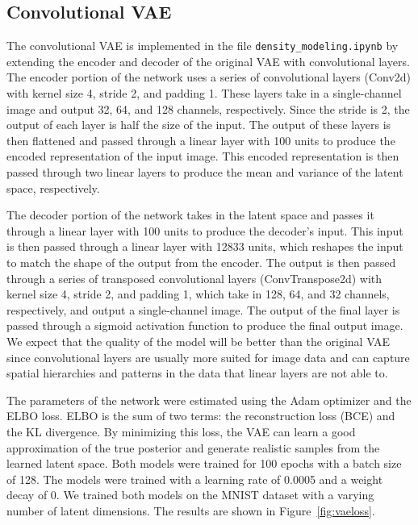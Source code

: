 \subsection*{Convolutional VAE}
The convolutional VAE is implemented in the file \texttt{density\_modeling.ipynb} by extending the encoder and decoder of the original VAE with convolutional layers. The encoder portion of the network uses a series of convolutional layers (Conv2d) with kernel size 4, stride 2, and padding 1. These layers take in a single-channel image and output 32, 64, and 128 channels, respectively. Since the stride is 2, the output of each layer is half the size of the input. The output of these layers is then flattened and passed through a linear layer with 100 units to produce the encoded representation of the input image. This encoded representation is then passed through two linear layers to produce the mean and variance of the latent space, respectively.

The decoder portion of the network takes in the latent space and passes it through a linear layer with 100 units to produce the decoder's input. This input is then passed through a linear layer with 12833 units, which reshapes the input to match the shape of the output from the encoder. The output is then passed through a series of transposed convolutional layers (ConvTranspose2d) with kernel size 4, stride 2, and padding 1, which take in 128, 64, and 32 channels, respectively, and output a single-channel image. The output of the final layer is passed through a sigmoid activation function to produce the final output image. We expect that the quality of the model will be better than the original VAE since convolutional layers are usually more suited for image data and can capture spatial hierarchies and patterns in the data that linear layers are not able to.

The parameters of the network were estimated using the Adam optimizer and the ELBO loss. ELBO is the sum of two terms: the reconstruction loss (BCE) and the KL divergence. By minimizing this loss, the VAE can learn a good approximation of the true posterior and generate realistic samples from the learned latent space. Both models were trained for 100 epochs with a batch size of 128. The models were trained with a learning rate of 0.0005 and a weight decay of 0. We trained both models on the MNIST dataset with a varying number of latent dimensions. The results are shown in Figure~\ref{fig:vaeloss}.

